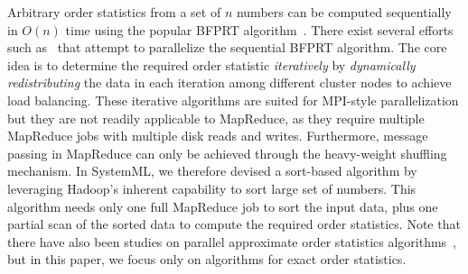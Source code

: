 Arbitrary order statistics from a set of $n$ numbers can be computed sequentially in $O(n)$ time using the popular BFPRT algorithm~\cite{blum1973time}. There exist several efforts such as~\cite{bader2004improved} that attempt to parallelize the sequential BFPRT algorithm. The core idea is to determine the required order statistic {\em iteratively} by {\em dynamically redistributing} the data in each iteration among different cluster nodes to achieve load balancing. These iterative algorithms are suited for MPI-style parallelization but they are not readily applicable to MapReduce, as they require multiple MapReduce jobs with multiple disk reads and writes. Furthermore, message passing in MapReduce can only be achieved through the heavy-weight shuffling mechanism. %
In SystemML, we therefore devised a sort-based algorithm by leveraging Hadoop's inherent capability to sort large set of numbers. This algorithm needs only one full MapReduce job to sort the input data, plus one partial scan of the sorted data to compute the required order statistics. Note that there have also been studies on parallel approximate order statistics algorithms~\cite{chaudhuri1993approximate}, but in this paper, we focus only on algorithms for exact order statistics. 

